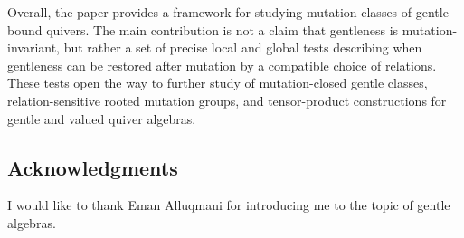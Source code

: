 \documentclass[11pt]{article}
\theoremstyle{plain}
\theoremstyle{definition}
\theoremstyle{remark}
\begin{document}
Overall, the paper provides a framework for studying mutation classes of
gentle bound quivers.  The main contribution is not a claim that gentleness is
mutation-invariant, but rather a set of precise local and global tests
describing when gentleness can be restored after mutation by a compatible
choice of relations.  These tests open the way to further study of
mutation-closed gentle classes, relation-sensitive rooted mutation groups,
and tensor-product constructions for gentle and valued quiver algebras.



\subsection*{Acknowledgments} I would like to thank Eman Alluqmani for introducing me to the topic of gentle algebras.
\end{document}
